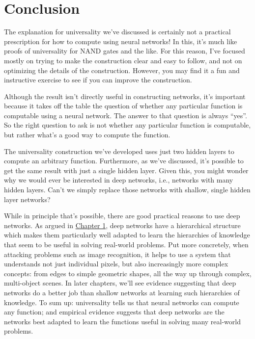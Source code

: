 \documentclass[a4paper,twoside,10pt]{book}
\begin{document}
\section*{Conclusion}
The explanation for universality we've discussed is certainly not a practical prescription for how to compute using neural networks! In this, it's much like proofs of universality for NAND gates and the like. For this reason, I've focused mostly on trying to make the construction clear and easy to follow, and not on optimizing the details of the construction. However, you may find it a fun and instructive exercise to see if you can improve the construction.

Although the result isn't directly useful in constructing networks, it's important because it takes off the table the question of whether any particular function is computable using a neural network. The answer to that question is always ``yes''. So the right question to ask is not whether any particular function is computable, but rather what's a good way to compute the function.

The universality construction we've developed uses just two hidden layers to compute an arbitrary function. Furthermore, as we've discussed, it's possible to get the same result with just a single hidden layer. Given this, you might wonder why we would ever be interested in deep networks, i.e., networks with many hidden layers. Can't we simply replace those networks with shallow, single hidden layer networks?


While in principle that's possible, there are good practical reasons to use deep networks. As argued in \hyperref[sec:1.8]{Chapter 1}, deep networks have a hierarchical structure which makes them particularly well adapted to learn the hierarchies of knowledge that seem to be useful in solving real-world problems. Put more concretely, when attacking problems such as image recognition, it helps to use a system that understands not just individual pixels, but also increasingly more complex concepts: from edges to simple geometric shapes, all the way up through complex, multi-object scenes. In later chapters, we'll see evidence suggesting that deep networks do a better job than shallow networks at learning such hierarchies of knowledge. To sum up: universality tells us that neural networks can compute any function; and empirical evidence suggests that deep networks are the networks best adapted to learn the functions useful in solving many real-world problems.
\end{document}
